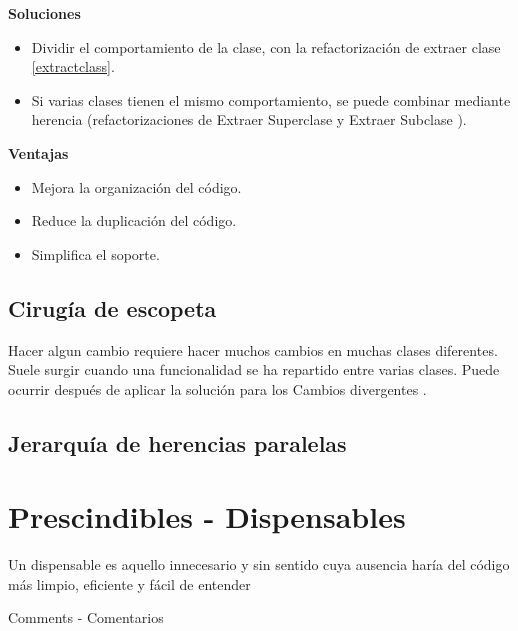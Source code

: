 \documentclass[11pt,a4paper,oneside]{book}
\begin{document}
\textbf{Soluciones}
\begin{itemize}
    \item Dividir el comportamiento de la clase, con la refactorización de extraer clase \ref{extractclass}.
    \item Si varias clases tienen el mismo comportamiento, se puede combinar mediante herencia (refactorizaciones de Extraer Superclase \hyperef[extractsuperclass] y Extraer Subclase \hyperef[extractsubclass]).
\end{itemize} 

\textbf{Ventajas}
\begin{itemize}
    \item Mejora la organización del código.
    \item Reduce la duplicación del código.
    \item Simplifica el soporte.
\end{itemize}

\subsection{Cirugía de escopeta}
Hacer algun cambio requiere hacer muchos cambios en muchas clases diferentes.
\newline
Suele surgir cuando una funcionalidad se ha repartido entre varias clases. Puede ocurrir después de aplicar la solución para los Cambios divergentes \hyperef[cambiosdivergentes].


\subsection{Jerarquía de herencias paralelas}




\section{Prescindibles - Dispensables}


Un dispensable es aquello innecesario y sin sentido cuya ausencia haría del código más limpio, eficiente y fácil de entender


    Comments - Comentarios
    
    
    
\end{document}

